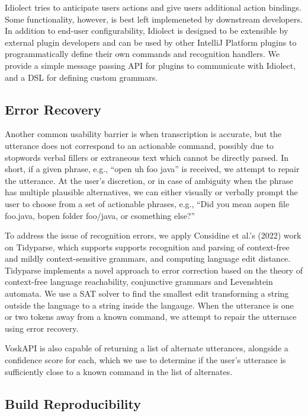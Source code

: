 \documentclass[conference]{IEEEtran}
\begin{document}
Idiolect tries to anticipate users actions and give users additional action bindings. Some functionality, however, is best left implemeneted by downstream developers. In addition to end-user configurability, Idiolect is designed to be extensible by external plugin developers and can be used by other IntelliJ Platform plugins to programmatically define their own commands and recognition handlers. We provide a simple message passing API for plugins to communicate with Idiolect, and a DSL for defining custom grammars.

\subsection{Error Recovery}\label{sec:error}

Another common usability barrier is when transcription is accurate, but the utterance does not correspond to an actionable command, possibly due to stopwords verbal fillers or extraneous text which cannot be directly parsed. In short, if a given phrase, e.g., ``open uh foo java'' is received, we attempt to repair the utterance. At the user's discretion, or in case of ambiguity when the phrase has multiple plausible alternatives, we can either visually or verbally prompt the user to choose from a set of actionable phrases, e.g., ``Did you mean \textlangle a\textrangle open file foo.java, \textlangle b\textrangle open folder foo/java, or \textlangle c\textrangle something else?''

To address the issue of recognition errors, we apply Considine et al.'s (2022) work on Tidyparse, which supports supports recognition and parsing of context-free and mildly context-sensitive grammars, and computing language edit distance. Tidyparse implements a novel approach to error correction based on the theory of context-free language reachability, conjunctive grammars and Levenshtein automata. We use a SAT solver to find the smallest edit transforming a string outside the language to a string inside the langauge. When the utterance is one or two tokens away from a known command, we attempt to repair the utternace using error recovery.

VoskAPI is also capable of returning a list of alternate utterances, alongside a confidence score for each, which we use to determine if the user's utterance is sufficiently close to a known command in the list of alternates.

\subsection{Build Reproducibility}
\end{document}
